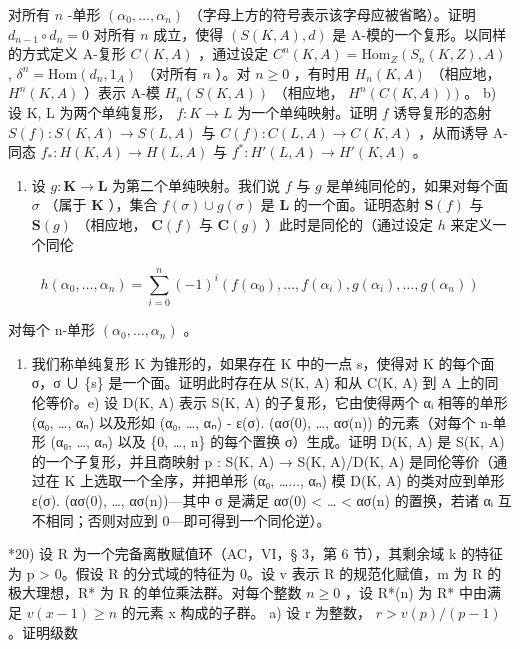 对所有 \(n\) -单形 \((\alpha_0, \ldots, \alpha_n)\) （字母上方的符号表示该字母应被省略）。证明 \(d_{n-1} \circ d_n = 0\) 对所有 \(n\) 成立，使得 \((S(K, A), d)\) 是 A-模的一个复形。以同样的方式定义 A-复形 \(C(K, A)\) ，通过设定 \(C^n(K, A) = \text{Hom}_Z(S_n(K, Z), A)\) , \(\delta^n = \text{Hom}(d_n, 1_A)\) （对所有 \(n\) ）。对 \(n \geqslant 0\) ，有时用 \(H_n(K, A)\) （相应地， \(H^n(K, A)\) ）表示 A-模 \(H_n(S(K, A))\) （相应地， \(H^n(C(K, A)))\) 。 b) 设 K, L 为两个单纯复形， \(f: K \to L\) 为一个单纯映射。证明 \(f\) 诱导复形的态射 \(S(f): S(K, A) \to S(L, A)\) 与 \(C(f): C(L, A) \to C(K, A)\) ，从而诱导 A-同态 \(f_*: H(K, A) \to H(L, A)\) 与 \(f^*: H'(L, A) \to H'(K, A)\) 。

\begin{enumerate}
\def\labelenumi{\alph{enumi})}
\setcounter{enumi}{2}
\tightlist
\item
  设 \(g: \mathbf{K} \to \mathbf{L}\) 为第二个单纯映射。我们说 \(f\) 与 \(g\) 是单纯同伦的，如果对每个面 \(\sigma\) （属于 \(\mathbf{K}\) ），集合 \(f(\sigma) \cup g(\sigma)\) 是 \(\mathbf{L}\) 的一个面。证明态射 \(\mathbf{S}(f)\) 与 \(\mathbf{S}(g)\) （相应地， \(\mathbf{C}(f)\) 与 \(\mathbf{C}(g)\) ）此时是同伦的（通过设定 \(h\) 来定义一个同伦
\end{enumerate}

\[
h (\alpha_ {0}, \dots , \alpha_ {n}) = \sum_ {i = 0} ^ {n} (- 1) ^ {i} (f (\alpha_ {0}), \dots , f (\alpha_ {i}), g (\alpha_ {i}), \dots , g (\alpha_ {n}))
\]

对每个 n-单形 \((\alpha_{0}, \ldots, \alpha_{n})\) 。

\begin{enumerate}
\def\labelenumi{\alph{enumi})}
\setcounter{enumi}{3}
\tightlist
\item
我们称单纯复形 K 为锥形的，如果存在 K 中的一点 s，使得对 K 的每个面 σ，σ ∪ \{s\} 是一个面。证明此时存在从 S(K, A) 和从 C(K, A) 到 A 上的同伦等价。e) 设 D(K, A) 表示 S(K, A) 的子复形，它由使得两个 αᵢ 相等的单形 (α₀, \ldots, αₙ) 以及形如 (α₀, \ldots, αₙ) - ε(σ). (ασ(0), \ldots, ασ(n)) 的元素（对每个 n-单形 (α₀, \ldots, αₙ) 以及 \{0, \ldots, n\} 的每个置换 σ）生成。证明 D(K, A) 是 S(K, A) 的一个子复形，并且商映射 p : S(K, A) → S(K, A)/D(K, A) 是同伦等价（通过在 K 上选取一个全序，并把单形 (α₀, \ldots..., αₙ) 模 D(K, A) 的类对应到单形 ε(σ). (ασ(0), \ldots, ασ(n))—其中 σ 是满足 ασ(0) \textless{} \ldots{} \textless{} ασ(n) 的置换，若诸 αᵢ 互不相同；否则对应到 0—即可得到一个同伦逆）。
\end{enumerate}

*20) 设 R 为一个完备离散赋值环（AC，VI，§ 3，第 6 节），其剩余域 k 的特征为 p \textgreater{} 0。假设 R 的分式域的特征为 0。设 v 表示 R 的规范化赋值，m 为 R 的极大理想，R* 为 R 的单位乘法群。对每个整数 \(n \geqslant 0\) ，设 R*(n) 为 R* 中由满足 \(v(x - 1) \geqslant n\) 的元素 x 构成的子群。 a) 设 r 为整数， \(r > v(p)/(p - 1)\) 。证明级数

